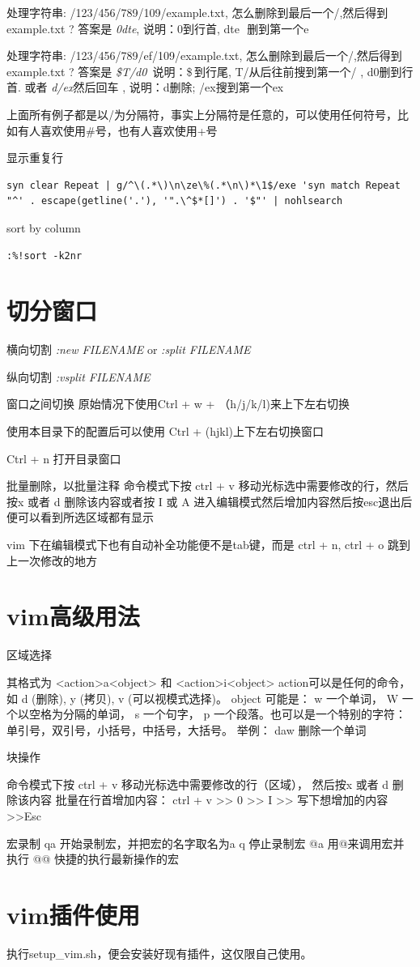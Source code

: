 处理字符串: /123/456/789/109/example.txt, 怎么删除到最后一个/,然后得到example.txt ? 答案是 \textit{0dte}, 说明：0到行首, dte   删到第一个e 

处理字符串: /123/456/789/ef/109/example.txt, 怎么删除到最后一个/,然后得到example.txt ?  答案是 \textit{\$T/d0  } 说明：\$ 到行尾, T/从后往前搜到第一个/ 
,  d0删到行首. 或者 \textit{d/ex}然后回车 , 说明：d删除;  /ex搜到第一个ex 
 
上面所有例子都是以/为分隔符，事实上分隔符是任意的，可以使用任何符号，比如有人喜欢使用\#号，也有人喜欢使用+号 



显示重复行
\begin{lstlisting}
syn clear Repeat | g/^\(.*\)\n\ze\%(.*\n\)*\1$/exe 'syn match Repeat "^' . escape(getline('.'), '".\^$*[]') . '$"' | nohlsearch  
 \end{lstlisting}
sort by column  
\begin{lstlisting}
:%!sort -k2nr
\end{lstlisting}

\section{切分窗口}
横向切割 \textit{:new FILENAME } or \textit{:split FILENAME }

纵向切割  \textit{:vsplit FILENAME}

窗口之间切换 原始情况下使用Ctrl + w + （h/j/k/l)来上下左右切换   

使用本目录下的配置后可以使用 Ctrl + (hjkl)上下左右切换窗口 

Ctrl + n 打开目录窗口


批量删除，以批量注释
命令模式下按 ctrl + v  移动光标选中需要修改的行，然后按x 或者 d 删除该内容或者按 I 或 A 进入编辑模式然后增加内容然后按esc退出后便可以看到所选区域都有显示

vim 下在编辑模式下也有自动补全功能便不是tab键，而是 ctrl + n,
ctrl + o 跳到上一次修改的地方

\section{vim高级用法}

区域选择 

其格式为 <action>a<object> 和 <action>i<object> 
action可以是任何的命令，如 d (删除), y (拷贝), v (可以视模式选择)。 
object 可能是： w 一个单词， W 一个以空格为分隔的单词， s 一个句字， p 一个段落。也可以是一个特别的字符：单引号，双引号，小括号，中括号，大括号。 
举例： daw 删除一个单词

块操作 

命令模式下按 ctrl + v 移动光标选中需要修改的行（区域）， 
然后按x 或者 d 删除该内容
批量在行首增加内容： 
ctrl + v >> 0 >> I >> 写下想增加的内容 >>Esc 


宏录制 
qa 开始录制宏，并把宏的名字取名为a 
q 停止录制宏 
@a 用@来调用宏并执行 
@@ 快捷的执行最新操作的宏 

\section{vim插件使用}

执行setup_vim.sh，便会安装好现有插件，这仅限自己使用。


